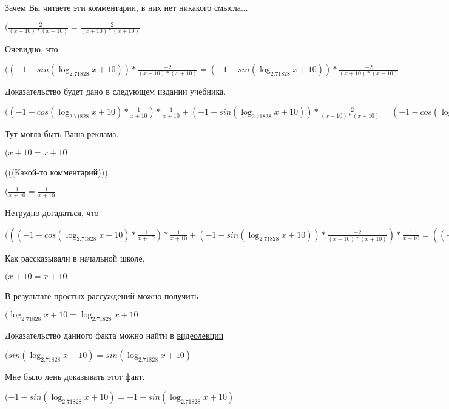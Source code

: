 \documentclass[12pt,a4paper,fleqn]{article}
\theoremstyle{definition}
\begin{document}
Зачем Вы читаете эти комментарии, в них нет никакого смысла...

$(\frac{ -2 }{( x  +  10 ) * ( x  +  10 )}
 = \frac{ -2 }{( x  +  10 ) * ( x  +  10 )}
$

Очевидно, что

$(( -1  - sin(\log_{ 2.71828 }{ x  +  10 })) * \frac{ -2 }{( x  +  10 ) * ( x  +  10 )}
 = ( -1  - sin(\log_{ 2.71828 }{ x  +  10 })) * \frac{ -2 }{( x  +  10 ) * ( x  +  10 )}
$

Доказательство будет дано в следующем издании учебника.

$(( -1  - cos(\log_{ 2.71828 }{ x  +  10 }) * \frac{ 1 }{ x  +  10 }
) * \frac{ 1 }{ x  +  10 }
 + ( -1  - sin(\log_{ 2.71828 }{ x  +  10 })) * \frac{ -2 }{( x  +  10 ) * ( x  +  10 )}
 = ( -1  - cos(\log_{ 2.71828 }{ x  +  10 }) * \frac{ 1 }{ x  +  10 }
) * \frac{ 1 }{ x  +  10 }
 + ( -1  - sin(\log_{ 2.71828 }{ x  +  10 })) * \frac{ -2 }{( x  +  10 ) * ( x  +  10 )}
$

Тут могла быть Ваша реклама.

$( x  +  10  =  x  +  10 $

(((Какой-то комментарий)))

$(\frac{ 1 }{ x  +  10 }
 = \frac{ 1 }{ x  +  10 }
$

Нетрудно догадаться, что

$((( -1  - cos(\log_{ 2.71828 }{ x  +  10 }) * \frac{ 1 }{ x  +  10 }
) * \frac{ 1 }{ x  +  10 }
 + ( -1  - sin(\log_{ 2.71828 }{ x  +  10 })) * \frac{ -2 }{( x  +  10 ) * ( x  +  10 )}
) * \frac{ 1 }{ x  +  10 }
 = (( -1  - cos(\log_{ 2.71828 }{ x  +  10 }) * \frac{ 1 }{ x  +  10 }
) * \frac{ 1 }{ x  +  10 }
 + ( -1  - sin(\log_{ 2.71828 }{ x  +  10 })) * \frac{ -2 }{( x  +  10 ) * ( x  +  10 )}
) * \frac{ 1 }{ x  +  10 }
$

Как рассказывали в начальной школе,

$( x  +  10  =  x  +  10 $

В результате простых рассуждений можно получить

$(\log_{ 2.71828 }{ x  +  10 } = \log_{ 2.71828 }{ x  +  10 }$

Доказательство данного факта можно найти в \href{https://www.youtube.com/watch?v=dQw4w9WgXcQ}{видеолекции}

$(sin(\log_{ 2.71828 }{ x  +  10 }) = sin(\log_{ 2.71828 }{ x  +  10 })$

Мне было лень доказывать этот факт.

$( -1  - sin(\log_{ 2.71828 }{ x  +  10 }) =  -1  - sin(\log_{ 2.71828 }{ x  +  10 })$
\end{document}
